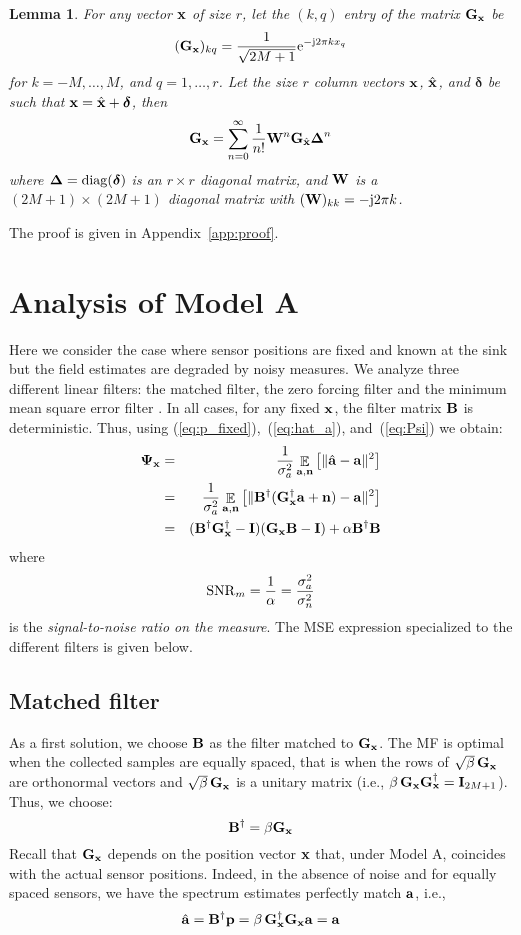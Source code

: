 \documentclass[final, a4paper]{IEEEtran}
\newtheorem{lem}{Lemma}[section]
\newcommand{\ee}{{\rm e}}
\newcommand{\jj}{{\rm j}}  \newcommand{\ii}{{\rm i}}  \newcommand{\dd}{{\rm\,d}}
\newcommand{\av}{{\bf a}}
\newcommand{\nv}{{\bf n}}
\newcommand{\pv}{{\bf p}}
\newcommand{\xv}{{\bf x}}
\newcommand{\Bm}{{\bf B}}
\newcommand{\Gm}{{\bf G}}
\newcommand{\Id}{{\bf I}}
\newcommand{\Wm}{{\bf W}}
\def\xvh{{\hat{\xv}}}
\newcommand{\deltav}{\boldsymbol{\delta}}
\newcommand{\Deltam}{\hbox{\boldmath$\Delta$}}
\newcommand{\Psim}{\hbox{\boldmath$\Psi$}}
\def\non{\nonumber\\}
\begin{document}
\begin{lem}
\label{lemma:1}
For any vector $\xv$ of size $r$, let the $(k,q)$ entry of the matrix
$\Gm_\xv$ be
\[ (\Gm_\xv)_{kq} = \frac{1}{\sqrt{2M+1}}\ee^{-\jj 2\pi k x_q} \]
for $k=-M,\ldots,M$, and $q=1,\ldots,r$. Let the size $r$ column vectors
$\xv$, $\xvh$, and $\deltav$ be such that $\xv = \xvh +\deltav$, then
\begin{equation}
\Gm_{\xv} = \sum_{n=0}^\infty \frac{1}{n!}\Wm^n \Gm_\xvh \Deltam^n
\label{eq:theorem_equation}
\end{equation}
where $\Deltam = {\rm diag}(\deltav)$ is an $r\times r$ diagonal matrix, and
$\Wm$ is a $(2M+1)\times (2M+1)$ diagonal matrix with $(\Wm)_{kk} = -\jj 2\pi k$.
\end{lem}
\medskip
{} The proof is given in Appendix~\ref{app:proof}.

\section{Analysis of Model A}
\label{sec:model_A}

Here we consider the case where sensor positions are fixed and known
at the sink but the field estimates are degraded by noisy measures.
We analyze three different linear filters: the matched filter, the
zero forcing filter and the minimum mean square error filter
\cite{Verdu_book}.
In all cases, for any fixed $\xv$, the filter matrix $\Bm$ is deterministic.
Thus, using (\ref{eq:p_fixed}),~(\ref{eq:hat_a}), and~(\ref{eq:Psi}) we obtain:
\begin{eqnarray}
\Psim_\xv
&=& \frac{1}{\sigma^2_a}\EE_{\av,\nv}\left[\|\hat{\av}-\av\|^2\right] \non
&=& \frac{1}{\sigma^2_a}\EE_{\av,\nv}\left[\|\Bm\Herm(\Gm_\xv\Herm\av+\nv)-\av\|^2\right] \non
&=& (\Bm\Herm\Gm_\xv\Herm-\Id)(\Gm_\xv\Bm-\Id) +\alpha\Bm\Herm\Bm
\label{eq:MSE_A}
\end{eqnarray}
where
\[ {\rm SNR}_m = \frac{1}{\alpha}=\frac{\sigma^2_a}{\sigma^2_n}\]
is the {\em signal-to-noise ratio on the measure}.
The MSE expression specialized to the different filters is given below.



\subsection{Matched filter}
As a first solution, we choose $\Bm$ as the filter matched to
$\Gm_\xv$. The MF is optimal  when the collected samples are equally
spaced,  that is when the rows of $\sqrt{\beta}\,\Gm_{\xv}$ are orthonormal
vectors and $\sqrt{\beta}\,\Gm_{\xv}$ is a unitary matrix (i.e.,
$\beta\,\Gm_{\xv}\Gm_{\xv}^\dagger=\Id_{2M+1}$). Thus, we choose:
\begin{equation}
\Bm\Herm = \beta\Gm_{\xv}
\label{eq:A_B_MF}
\end{equation}
Recall that $\Gm_{\xv}$ depends on the position vector $\xv$ that,
under Model A, coincides with the actual sensor positions.
Indeed, in the absence of noise and for equally spaced sensors, we have
the spectrum estimates perfectly match $\av$, i.e.,
\[ \hat{\av} = \Bm\Herm\pv = \beta\,\Gm_\xv\Herm\Gm_\xv\av = \av \]
\end{document}
